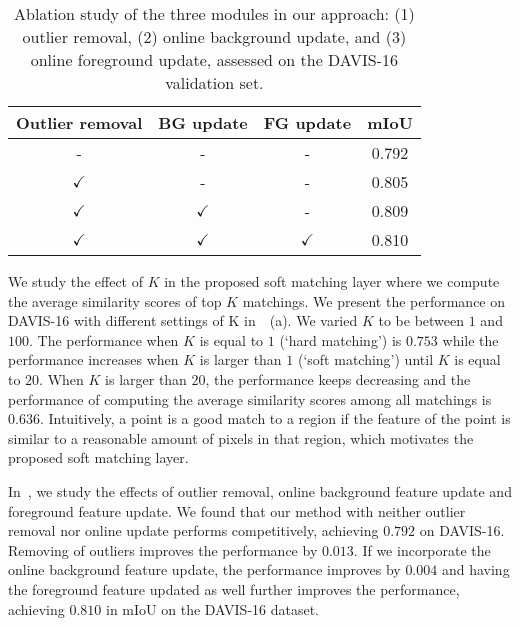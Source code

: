 \begin{table}[t]
\centering
\caption{Ablation study of the three modules in our approach: (1)  outlier removal, (2) online background update, and (3) online foreground update, assessed on the DAVIS-16 validation set.}
\label{tab:ablation}
		\tabcolsep=7pt
\begin{tabular}{cccc}
	\toprule
Outlier removal & BG update & FG update & mIoU  \\
\midrule
-               		& -         & -         & 0.792 \\
$\checkmark$   & -         & -         & 0.805 \\
$\checkmark$   & $\checkmark$ & -         & 0.809 \\
$\checkmark$   & $\checkmark$ & $\checkmark$ & 0.810 \\
\bottomrule
\end{tabular}
\end{table} 
 We study the effect of $K$ in the proposed soft matching layer where we compute the average similarity scores of top $K$ matchings. We present the performance on DAVIS-16 with different settings of K in~~(a). We varied $K$ to be between $1$ and $100$. The performance when $K$ is equal to $1$ (`hard matching') is $0.753$ while the performance increases when $K$ is larger than $1$ (`soft matching') until $K$ is equal to $20$. When $K$ is larger than $20$, the performance keeps decreasing and the performance of computing the average similarity scores among all matchings is $0.636$. Intuitively, a point is a good match to a region if the feature of the point is similar to a reasonable amount of pixels in that region, which motivates the proposed  soft matching layer.

In~, we study the effects of outlier removal, online background feature update and foreground feature update. We found that our method with neither outlier removal nor online update performs competitively, achieving $0.792$ on DAVIS-16. Removing of outliers improves the performance by $0.013$. If we incorporate  the online background feature update, the performance improves by $0.004$ and having the foreground feature updated as well further improves the performance, achieving $0.810$ in mIoU on the DAVIS-16 dataset.



